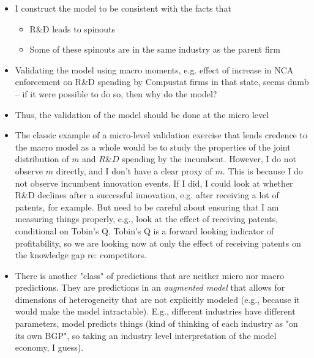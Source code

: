 \documentclass[11pt,english]{article}
\theoremstyle{remark}
\begin{document}
\begin{itemize}
	\item I construct the model to be consistent with the facts that
	\begin{itemize}
		\item R\&D leads to spinouts
		\item Some of these spinouts are in the same industry as the parent firm
	\end{itemize} 
	\item Validating the model using macro moments, e.g. effect of increase in NCA enforcement on R\&D spending by Compustat firms in that state, seems dumb -- if it were possible to do so, then why do the model?
	\item Thus, the validation of the model should be done at the micro level
	\item The classic example of a micro-level validation exercise that lends credence to the macro model as a whole would be to study the properties of the joint distribution of $m$ and $R\&D$ spending by the incumbent. However, I do not observe $m$ directly, and I don't have a clear proxy of $m$. This is because I do not observe incumbent innovation events. If I did, I could look at whether R\&D declines after a successful innovation, e.g. after receiving a lot of patents, for example. But need to be careful about ensuring that I am measuring things properly, e.g., look at the effect of receiving patents, conditional on Tobin's Q. Tobin's Q is a forward looking indicator of profitability, so we are looking now at only the effect of receiving patents on the knowledge gap re: competitors.
	\item There is another "class" of predictions that are neither micro nor macro predictions. They are predictions in an \textit{augmented model} that allows for dimensions of heterogeneity that are not explicitly modeled (e.g., because it would make the model intractable). E.g., different industries have different parameters, model predicts things (kind of thinking of each industry as "on its own BGP", so taking an industry level interpretation of the model economy, I guess).
\end{itemize}
\end{document}

